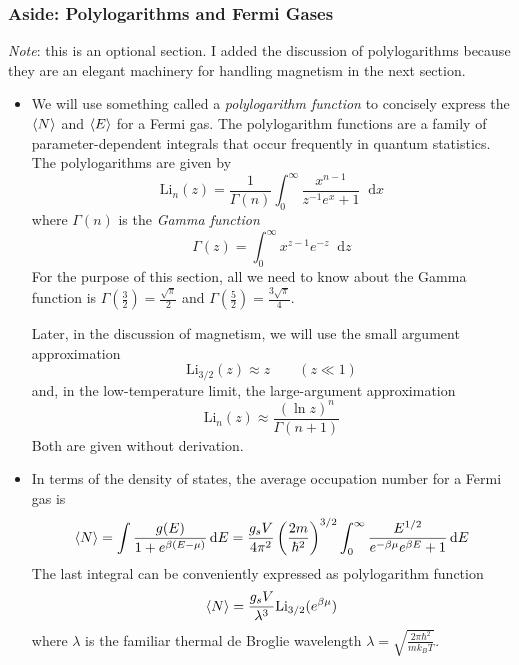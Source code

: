 \documentclass[11pt, a4paper]{article}
\newcommand{\diff}{\mathop{}\!\mathrm{d}} %
\begin{document}
\subsubsection{Aside: Polylogarithms and Fermi Gases} \label{sss:polylog}
\textit{Note}: this is an optional section. I added the discussion of polylogarithms because they are an elegant machinery for handling magnetism in the next section.
\begin{itemize}
	\item We will use something called a \textit{polylogarithm function} to concisely express the $ \expval{N} $ and $ \expval{E} $ for a Fermi gas. The polylogarithm functions are a family of parameter-dependent integrals that occur frequently in quantum statistics. The polylogarithms are given by
	\begin{equation*}
		\mathrm{Li}_{n}(z) = \frac{1}{\Gamma(n)} \int_{0}^{\infty} \frac{x^{n-1}}{z^{-1}e^{x}+1} \diff x
	\end{equation*}
	where $ \Gamma(n) $ is the \textit{Gamma function} 
	\begin{equation*}
		\Gamma(z) = \int_{0}^{\infty} x^{z-1}e^{-z}\diff z
	\end{equation*}
	For the purpose of this section, all we need to know about the Gamma function is $ \Gamma(\frac{3}{2}) = \frac{\sqrt{\pi}}{2} $ and $ \Gamma(\frac{5}{2}) = \frac{3\sqrt{\pi}}{4} $.

	Later, in the discussion of magnetism, we will use the small argument approximation
	\begin{equation*}
		\mathrm{Li}_{3/2}(z) \approx z \qquad (z \ll 1)
	\end{equation*}
	and, in the low-temperature limit, the large-argument approximation
	\begin{equation*}
		\mathrm{Li}_{n}(z) \approx \frac{(\ln z)^{n}}{\Gamma(n+1)} 
	\end{equation*}
	Both are given without derivation.
	
	\item In terms of the density of states, the average occupation number for a Fermi gas is
	\begin{equation*}
		\expval{N} = \int  \frac{g(E)}{1 + e^{\beta (E - \mu)}}  \diff E = \frac{g_{s}V}{4\pi^{2}} \left(\frac{2m}{\hbar^{2}}\right)^{3/2} \int_{0}^{\infty}\frac{E^{1/2}}{e^{-\beta \mu} e^{\beta E} + 1} \diff E 
	\end{equation*}
	The last integral can be conveniently expressed as polylogarithm function
	\begin{equation*}
		\expval{N} = \frac{g_{s}V}{\lambda^{3}}\mathrm{Li}_{3/2}(e^{\beta \mu})
	\end{equation*}
	where $ \lambda $ is the familiar thermal de Broglie wavelength $ \lambda = \sqrt{\frac{2\pi \hbar^{2}}{mk_{B}T}} $.
	

\end{itemize}
\end{document}
